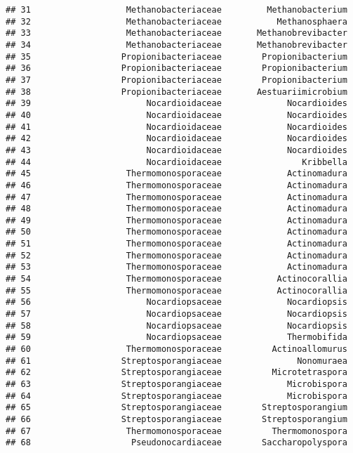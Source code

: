 \documentclass[
]{article}
\begin{document}
\begin{verbatim}
## 31                   Methanobacteriaceae         Methanobacterium
## 32                   Methanobacteriaceae           Methanosphaera
## 33                   Methanobacteriaceae       Methanobrevibacter
## 34                   Methanobacteriaceae       Methanobrevibacter
## 35                  Propionibacteriaceae        Propionibacterium
## 36                  Propionibacteriaceae        Propionibacterium
## 37                  Propionibacteriaceae        Propionibacterium
## 38                  Propionibacteriaceae       Aestuariimicrobium
## 39                       Nocardioidaceae             Nocardioides
## 40                       Nocardioidaceae             Nocardioides
## 41                       Nocardioidaceae             Nocardioides
## 42                       Nocardioidaceae             Nocardioides
## 43                       Nocardioidaceae             Nocardioides
## 44                       Nocardioidaceae                Kribbella
## 45                   Thermomonosporaceae             Actinomadura
## 46                   Thermomonosporaceae             Actinomadura
## 47                   Thermomonosporaceae             Actinomadura
## 48                   Thermomonosporaceae             Actinomadura
## 49                   Thermomonosporaceae             Actinomadura
## 50                   Thermomonosporaceae             Actinomadura
## 51                   Thermomonosporaceae             Actinomadura
## 52                   Thermomonosporaceae             Actinomadura
## 53                   Thermomonosporaceae             Actinomadura
## 54                   Thermomonosporaceae           Actinocorallia
## 55                   Thermomonosporaceae           Actinocorallia
## 56                       Nocardiopsaceae             Nocardiopsis
## 57                       Nocardiopsaceae             Nocardiopsis
## 58                       Nocardiopsaceae             Nocardiopsis
## 59                       Nocardiopsaceae             Thermobifida
## 60                   Thermomonosporaceae          Actinoallomurus
## 61                  Streptosporangiaceae               Nonomuraea
## 62                  Streptosporangiaceae          Microtetraspora
## 63                  Streptosporangiaceae             Microbispora
## 64                  Streptosporangiaceae             Microbispora
## 65                  Streptosporangiaceae        Streptosporangium
## 66                  Streptosporangiaceae        Streptosporangium
## 67                   Thermomonosporaceae          Thermomonospora
## 68                    Pseudonocardiaceae        Saccharopolyspora

\end{verbatim}
\end{document}
